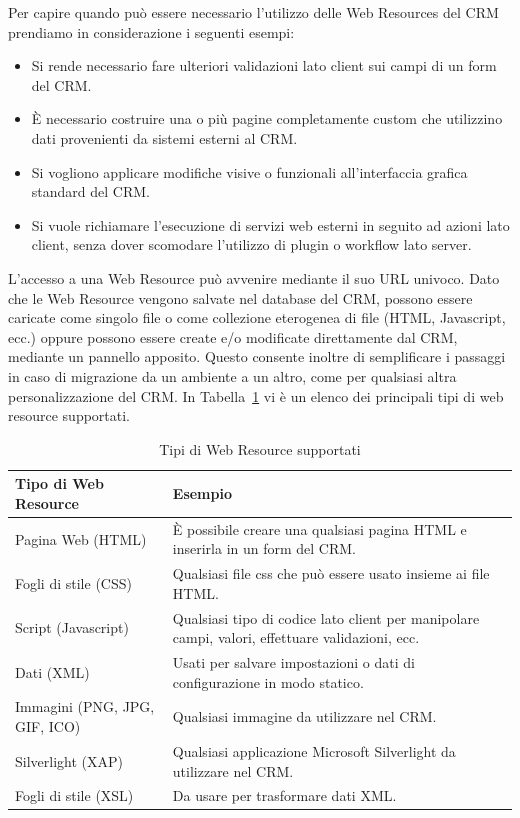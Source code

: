 Per capire quando può essere necessario l'utilizzo delle Web Resources del CRM prendiamo in considerazione i seguenti esempi: 
\begin{itemize}
  \item Si rende necessario fare ulteriori validazioni lato client sui campi di un form del CRM.
  \item È necessario costruire una o più pagine completamente custom che utilizzino dati provenienti da sistemi esterni al CRM.
  \item Si vogliono applicare modifiche visive o funzionali all'interfaccia grafica standard del CRM.
  \item Si vuole richiamare l'esecuzione di servizi web esterni in seguito ad azioni lato client, senza dover scomodare l'utilizzo di plugin o workflow lato server.
\end{itemize}

L'accesso a una Web Resource può avvenire mediante il suo URL univoco. Dato che le Web Resource vengono salvate nel database del CRM, possono essere caricate come singolo file o come collezione eterogenea di file (HTML, Javascript, ecc.) oppure possono essere create e/o modificate direttamente dal CRM, mediante un pannello apposito. Questo consente inoltre di semplificare i passaggi in caso di migrazione da un ambiente a un altro, come per qualsiasi altra personalizzazione del CRM. In Tabella~\ref{table:webResourceType} vi è un elenco dei principali tipi di web resource supportati.

\begin{table}[ht]
  \centering
  \begin{tabular}{lp{}}
    \toprule
      \textbf{Tipo di Web Resource} & \textbf{Esempio} \\ 
    \midrule
      Pagina Web (HTML) & È possibile creare una qualsiasi pagina HTML e inserirla in un form del CRM. \\
      \midrule 
      Fogli di stile (CSS) & Qualsiasi file css che può essere usato insieme ai file HTML. \\ 
      \midrule
      Script (Javascript) & Qualsiasi tipo di codice lato client per manipolare campi, valori, effettuare validazioni, ecc. \\ 
      \midrule
      Dati (XML) & Usati per salvare impostazioni o dati di configurazione in modo statico. \\
      \midrule 
      Immagini (PNG, JPG, GIF, ICO) & Qualsiasi immagine da utilizzare nel CRM.\\ 
      \midrule
      Silverlight (XAP) & Qualsiasi applicazione Microsoft Silverlight da utilizzare nel CRM. \\ 
      \midrule
      Fogli di stile (XSL) & Da usare per trasformare dati XML. \\ 
      \bottomrule
  \end{tabular}
  \caption{Tipi di Web Resource supportati}
  \label{table:webResourceType}
\end{table}

